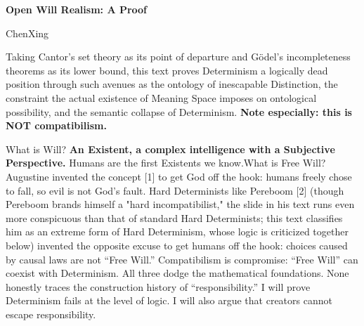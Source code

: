 \documentclass[11pt]{article}
\renewcommand{\\}[1][\mynewlineskip]{\oldnewline[#1]}
\begin{document}
\begin{center}
{\LARGE\bfseries Open Will Realism: A Proof}

\vspace{0.5em}
ChenXing
\end{center}

\vspace{1em}
Taking Cantor's set theory as its point of departure and Gödel's incompleteness theorems as its lower bound, this text proves Determinism a logically dead position through such avenues as the ontology of inescapable Distinction, the constraint the actual existence of Meaning Space imposes on ontological possibility, and the semantic collapse of Determinism. \textbf{Note especially: this is NOT compatibilism.}

\vspace{1em}
What is Will? \textbf{An Existent, a complex intelligence with a Subjective Perspective.} Humans are the first Existents we know.\\
What is Free Will? Augustine invented the concept [1] to get God off the hook: humans freely chose to fall, so evil is not God's fault. Hard Determinists like Pereboom [2] (though Pereboom brands himself a "hard incompatibilist," the slide in his text runs even more conspicuous than that of standard Hard Determinists; this text classifies him as an extreme form of Hard Determinism, whose logic is criticized together below) invented the opposite excuse to get humans off the hook: choices caused by causal laws are not ``Free Will.'' Compatibilism is compromise: ``Free Will'' can coexist with Determinism. All three dodge the mathematical foundations. None honestly traces the construction history of ``responsibility.'' I will prove Determinism fails at the level of logic. I will also argue that creators cannot escape responsibility.
\end{document}
